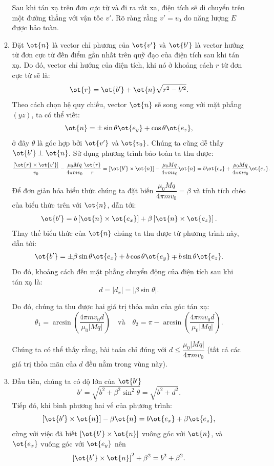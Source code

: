 \begin{loigiai}
\begin{enumerate}[1)]
\begin{enumerate}[1)]
Sau khi tán xạ trên đơn cực từ và đi ra rất xa, điện tích sẽ di chuyển trên một đường thẳng với vận tốc $v'$. Rõ ràng rằng $v'=v_0$ do năng lượng $E$ được bảo toàn.
\item Đặt $\ot{n}$ là vector chỉ phương của $\ot{v'}$ và $\ot{b'}$ là vector hướng từ đơn cực từ đến điểm gần nhất trên quỹ đạo của điện tích sau khi tán xạ. Do đó, vector chỉ hướng của điện tích, khi nó ở khoảng cách $r$ từ đơn cực từ sẽ là:
$$\ot{r} = \ot{b'} + \ot{n}\sqrt{r^2 - b'^2}.$$
Theo cách chọn hệ quy chiếu, vector $\ot{n}$ sẽ song song với mặt phẳng $(yz)$, ta có thể viết:
$$\ot{n} = \pm \sin \theta \ot{e_y} + \cos \theta \ot{e_z},$$
ở đây $\theta$ là góc hợp bởi $\ot{v'}$ và $\ot{v_0}$. Chúng ta cũng dễ thấy $\ot{b'} \perp \ot{n}$. Sử dụng phương trình bảo toàn ta thu được:
    \[ \dfrac{\left[\ot{r} \times \ot{v'}\right]}{v_0} - \dfrac{\mu_0 Mq}{4 \pi m v_0 } \dfrac{\ot{r}}{r} = \left[\ot{b'}\times \ot{n}\right] - \dfrac{\mu_0 Mq}{4\pi m v_0}\ot{n} = b \ot{e_x} + \dfrac{\mu_0 Mq}{4\pi m v_0}\ot{e_z}.\]

Để đơn giản hóa biểu thức chúng ta đặt biến $\dfrac{\mu_0Mq}{4\pi mv_0} = \beta$ và tính tích chéo của biểu thức trên với $\ot{n}$, dẫn tới: 
$$\ot{b'} = b\left[\ot{n}\times \ot{e_x}\right] + \beta \left[\ot{n} \times \ot{e_z}\right].$$
Thay thế biểu thức của $\ot{n}$ chúng ta thu được từ phương trình này, dẫn tới:
   \[\ot{b'} = \pm \beta \sin \theta \ot{e_x} + b \cos \theta\ot{e_y} \mp b \sin \theta \ot{e_z}.\]
Do đó, khoảng cách đến mặt phẳng chuyển động của điện tích sau khi tán xạ là:
  \[ d= |d_x| = \left|\beta \sin \theta \right|.\]

Do đó, chúng ta thu được hai giá trị thỏa mãn của góc tán xạ:
   \[ \theta_1 = \arcsin \left(\dfrac{4\pi m v_0 d}{\mu_0 |Mq|}\right) \quad \text{và} \quad \theta_2 = \pi - \arcsin \left(\dfrac{4\pi m v_0 d}{\mu_0 |Mq|}\right).\]

Chúng ta có thể thấy rằng, bài toán chỉ đúng với $d \leq \dfrac{\mu_0 |Mq|}{4\pi m v_0}$ (tất cả các giá trị thỏa mãn của $d$ đều nằm trong vùng này).
\item Đầu tiên, chúng ta có độ lớn của $\ot{b'}$
    \[ b' = \sqrt{b^2 + \beta^2 \sin^2 \theta} = \sqrt{b^2 + d^2}.\]
Tiếp đó, khi bình phương hai vế của phương trình:
   \[ \left[\ot{b'} \times \ot{n}\right] - \beta \ot{n} = b\ot{e_x} + \beta\ot{e_z},\]
cùng với việc đã biết $\left[\ot{b'}\times \ot{n}\right]$ vuông góc với $\ot{n}$, và $\ot{e_x}$ vuông góc với $\ot{e_y}$ nên
  \[\left[\ot{b'} \times \ot{n} \right]^2 + \beta^2 = b^2 + \beta^2.\]


\end{enumerate}
\end{enumerate}
\end{loigiai}
